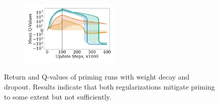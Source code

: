 \begin{figure}[t]
\begin{minipage}[b]{.62\textwidth}
\begin{subfigure}[b]{0.5\textwidth}
        \label{subfig:priming_abl_ret}
    \end{subfigure}%
    \begin{subfigure}[b]{0.5\textwidth}
    \centering
        \includegraphics[width=4.8cm, trim=1cm 1cm 1cm 1cm ,clip]{figures/dissecting/priming/priming_ablations_Q.pdf}
        \label{subfig:priming_abl_Q}
    \end{subfigure}%
    \caption{Return and
    Q-values of priming runs with weight decay and dropout. Results indicate that both regularizations mitigate priming to some extent but not sufficiently. }
    \label{fig:priming_abl}
\end{minipage}
\end{figure}


